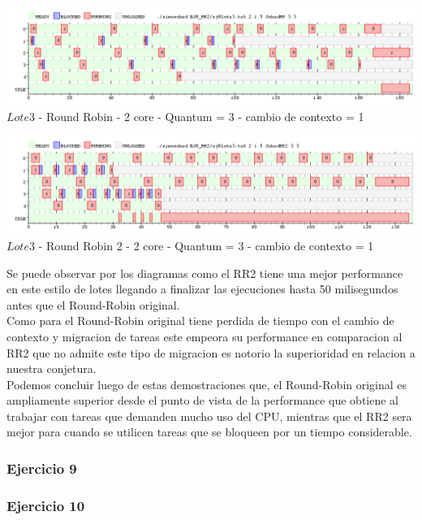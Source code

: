    \begin{center}
    	\includegraphics[width=450pt]{./EJ8_RR2/dif5corerr.png}
	{$Lote 3$ - Round Robin - 2 core - Quantum = 3 - cambio de contexto = 1}	
 \end{center}
 
 \begin{center}
    	\includegraphics[width=450pt]{./EJ8_RR2/dif5corerr2.png}
	{$Lote 3$ - Round Robin 2 - 2 core - Quantum = 3 - cambio de contexto = 1}	
 \end{center}

 Se puede observar por los diagramas como el RR2 tiene una mejor performance en este estilo
 de lotes llegando a finalizar las ejecuciones hasta 50 milisegundos antes que el Round-Robin
 original.\\
 Como para el Round-Robin original tiene perdida de tiempo con el cambio de contexto y
 migracion de tareas este empeora su performance en comparacion al RR2 que no admite
 este tipo de migracion es notorio la superioridad en relacion a nuestra conjetura.\\
 
 Podemos concluir luego de estas demostraciones que, el Round-Robin original es ampliamente
 superior desde el punto de vista de la performance que obtiene al trabajar con tareas
 que demanden mucho uso del CPU, mientras que el RR2 sera mejor para cuando se utilicen
 tareas que se bloqueen por un tiempo considerable.\\
 
 


  
\subsubsection[Resolución Ejercicio 9]{Ejercicio 9}

\subsubsection[Resolución Ejercicio 10]{Ejercicio 10}
